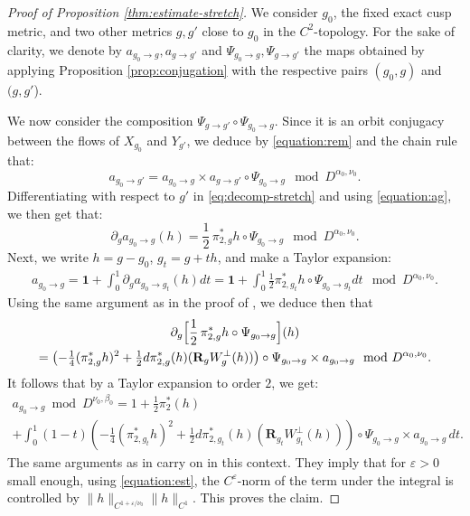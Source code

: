 \documentclass[10pt]{amsart}
\newcommand{\eps}{\varepsilon}
\theoremstyle{plain}
\theoremstyle{definition}
\begin{document}
\begin{proof}[Proof of Proposition \ref{thm:estimate-stretch}]
We consider $g_0$, the fixed exact cusp metric, and two other metrics $g,g'$ close to $g_0$ in the $C^2$-topology. For the sake of clarity, we denote by $a_{g_0 \to g}, a_{g \to g'}$ and $\Psi_{g_0 \to g}, \Psi_{g \to g'}$ the maps obtained by applying Proposition \ref{prop:conjugation} with the respective pairs $(g_0,g)$ and $(g,g'$).

We now consider the composition $\Psi_{g\to g'}\circ\Psi_{g_0\to g}$. Since it is an orbit conjugacy between the flows of $X_{g_0}$ and $Y_{g'}$, we deduce by \eqref{equation:rem} and the chain rule that:
\begin{equation}\label{eq:decomp-stretch}
a_{g_0\to g'} = a_{g_0\to g} \times a_{g\to g'}\circ \Psi_{g_0\to g} \mod D^{\alpha_0,\nu_0}.
\end{equation}
Differentiating with respect to $g'$ in \eqref{eq:decomp-stretch} and using \eqref{equation:ag}, we then get that:
\[
\partial_{g} a_{g_0\to g}(h) = \frac{1}{2}\,\pi_{2,g}^\ast h \circ \Psi_{g_0\to g} \mod D^{\alpha_0,\nu_0}.
\]
Next, we write $h = g-g_0$, $g_t = g+th$, and make a Taylor expansion:
\begin{align*}
a_{g_0\to g} = \mathbf{1} + \int_0^1 \partial_g a_{g_0\to g_t}(h) dt= \mathbf{1} + \int_0^1 \tfrac{1}{2} \pi_{2,g_t}^\ast h \circ \Psi_{g_0\to g_t} dt \mod D^{\alpha_0,\nu_0}.
\end{align*}
Using the same argument as in the proof of \cite[Lem.\,5.7]{Bonthonneau-Lefeuvre-21}, we deduce then that
\begin{multline*}
\partial_g \Bigl[ \frac{1}{2}\,\pi_{2,g}^\ast h \circ \Psi_{g_0\to g} \Bigr](h)\\
= \left( -\tfrac{1}{4}(\pi_{2,g}^\ast h)^2 + \tfrac{1}{2} d \pi_{2,g}^\ast(h) ( \mathbf{R}_g W_g^\perp(h) )\right) \circ \Psi_{g_0\to g} \times a_{g_0\to g} \mod D^{\alpha_0,\nu_0}.
\end{multline*}
It follows that by a Taylor expansion to order $2$, we get:
\begin{multline*}
a_{g_0\to g}\bmod D^{\nu_0,\beta_0} = 1+ \tfrac{1}{2}\pi_{2}^\ast(h) \\
+ \int_0^1 (1-t) \left( -\tfrac{1}{4}(\pi_{2,g_t}^\ast h)^2 + \tfrac{1}{2} d \pi_{2,g_t}^\ast(h) ( \mathbf{R}_{g_t} W_{g_t}^\perp(h) )\right) \circ \Psi_{g_0\to g} \times a_{g_0\to g}\,dt.
\end{multline*}
The same arguments as in \cite[Lem.\,5.8]{Bonthonneau-Lefeuvre-21} carry on in this context. They imply that for $\eps > 0$ small enough, using \eqref{equation:est}, the $C^\eps$-norm of the term under the integral is controlled by $\|h \|_{C^{1+\eps/\nu_0}} \| h \|_{C^1}$. This proves the claim.
\end{proof}
\end{document}
